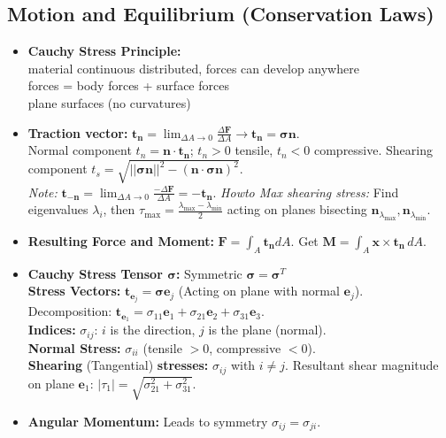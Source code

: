 \documentclass[10pt,twocolumn, a4paper]{article}
\begin{document}
\newpage
\subsection{Motion and Equilibrium (Conservation Laws)}
\begin{itemize}
    \item \textbf{Cauchy Stress Principle:}\\
    material continuous distributed, forces can develop anywhere \\
    forces = body forces + surface forces\\
    plane surfaces (no curvatures)
    \item \textbf{Traction vector:} $\bm{t}_{\bm{n}} = \lim_{\Delta A \to 0} \frac{\Delta \bm{F}}{\Delta A} \rightarrow \boxed{\bm{t}_{\bm{n}} = \bm{\sigma} \bm{n}}$. \\
    Normal component $t_n = \bm{n}\cdot\bm{t_n}$; $t_n > 0$ tensile, $t_n < 0$ compressive. 
    Shearing component $t_s = \sqrt{||\bm{\sigma}\bm{n}||^2-(\bm{n\cdot\sigma n})^2}$. \\
    \textit{Note:} $\bm{t}_{-\bm{n}} = \lim_{\Delta A \to 0} \frac{-\Delta \bm{F}}{\Delta A} = -\bm{t}_{\bm{n}}$.
    \textit{Howto Max shearing stress:} Find eigenvalues $\lambda_i$, then $\tau_{\max} = \frac{\lambda_{\max}-\lambda_{\min}}{2}$ acting on planes bisecting $\bm{n}_{\lambda_{\max}}, \bm{n}_{\lambda_{\min}}$. 
    \item \textbf{Resulting Force and Moment: } $\bm{F}=\int_A \bm{t_n} dA$. Get $\bm{M} = \int_A \bm{x} \times \bm{t_n} \, dA$. 
    \item \textbf{Cauchy Stress Tensor $\bm{\sigma}$:} Symmetric $\bm{\sigma} = \bm{\sigma}^T$ \\
    \textbf{Stress Vectors:} $\bm{t}_{\bm{e}_j} = \bm{\sigma} \bm{e}_j$ (Acting on plane with normal $\bm{e}_j$). \\
    Decomposition: $\bm{t}_{\bm{e}_1} = \sigma_{11} \bm{e}_1 + \sigma_{21} \bm{e}_2 + \sigma_{31} \bm{e}_3$. \\
    \textbf{Indices:} $\sigma_{ij}$: $i$ is the direction, $j$ is the plane (normal). \\
    \textbf{Normal Stress:} $\sigma_{ii}$ (tensile $> 0$, compressive $< 0$). \\
    \textbf{Shearing} (Tangential) \textbf{stresses:} $\sigma_{ij}$ with $i \neq j$. Resultant shear magnitude on plane $\bm{e}_1$: $|\tau_1| = \sqrt{\sigma_{21}^2 + \sigma_{31}^2}$.
    \item \textbf{Angular Momentum:} Leads to symmetry $\sigma_{ij} = \sigma_{ji}$.
\end{itemize}
\end{document}
